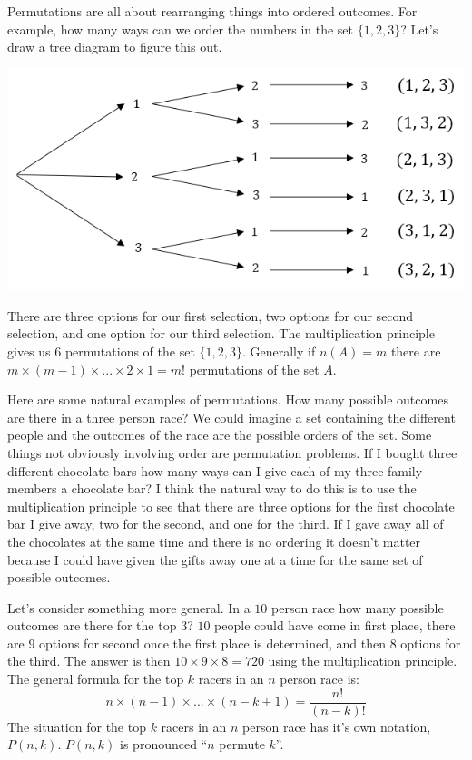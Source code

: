 \documentclass[
]{book}
\theoremstyle{definition}
\theoremstyle{definition}
\theoremstyle{definition}
\theoremstyle{remark}
\begin{document}
Permutations are all about rearranging things into ordered outcomes. For example, how many ways can we order the numbers in the set \(\{1,2,3\}\)? Let's draw a tree diagram to figure this out.

\includegraphics{Pictures/02-Counting/permute3large.PNG}

There are three options for our first selection, two options for our second selection, and one option for our third selection. The multiplication principle gives us 6 permutations of the set \(\{1,2,3\}\). Generally if \(n(A) = m\) there are \(m \times (m-1) \times ... \times 2 \times 1 = m!\) permutations of the set \(A\).

Here are some natural examples of permutations. How many possible outcomes are there in a three person race? We could imagine a set containing the different people and the outcomes of the race are the possible orders of the set. Some things not obviously involving order are permutation problems. If I bought three different chocolate bars how many ways can I give each of my three family members a chocolate bar? I think the natural way to do this is to use the multiplication principle to see that there are three options for the first chocolate bar I give away, two for the second, and one for the third. If I gave away all of the chocolates at the same time and there is no ordering it doesn't matter because I could have given the gifts away one at a time for the same set of possible outcomes.

Let's consider something more general. In a \(10\) person race how many possible outcomes are there for the top \(3\)? \(10\) people could have come in first place, there are \(9\) options for second once the first place is determined, and then \(8\) options for the third. The answer is then \(10 \times 9 \times 8=720\) using the multiplication principle. The general formula for the top \(k\) racers in an \(n\) person race is:
\[n \times (n-1) \times ... \times (n-k+1) = \frac{n!}{(n-k)!}\]
The situation for the top \(k\) racers in an \(n\) person race has it's own notation, \(P(n,k)\). \(P(n,k)\) is pronounced ``\(n\) permute \(k\)''.
\end{document}
